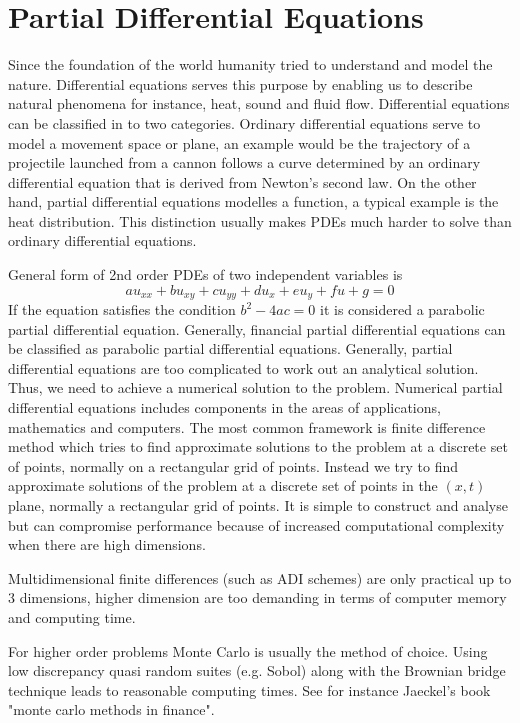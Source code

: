 \documentclass[12pt, oneside]{book}
\theoremstyle{plain}
\theoremstyle{definition}
\begin{document}
\section{Partial Differential Equations}
Since the foundation of the world humanity tried to understand and model the nature. Differential equations serves this purpose by enabling us to describe natural phenomena for instance, heat, sound and fluid flow. 
Differential equations can be classified in to two categories. Ordinary differential equations serve to model a movement space or plane, an example would be the trajectory of a projectile launched from a cannon follows a curve determined by an ordinary differential equation that is derived from Newton's second law.
On the other hand, partial differential equations modelles a function, a typical example is the heat distribution. This distinction usually makes PDEs much harder to solve than ordinary differential equations.

General form of 2nd order PDEs of two independent variables is $$ au_{xx} + bu_{xy} + cu_{yy} + du_x + eu_y + fu + g = 0 $$ If the equation satisfies the condition $ b^2 - 4ac = 0 $  it is considered a parabolic partial differential equation. Generally, financial partial differential equations can be classified as parabolic partial differential equations. Generally, partial differential equations are too complicated to work out an analytical solution. Thus, we need to achieve a numerical solution to the problem. Numerical partial differential equations includes components in the areas of applications, mathematics and computers. The most common framework is finite difference method which tries to find approximate solutions to the problem at a discrete set of points, normally on a rectangular grid of points. Instead we try to find approximate solutions of the problem at a discrete set of points in the $(x, t)$ plane, normally a rectangular grid of points. It is simple to construct and analyse but can compromise performance because of increased computational complexity when there are high dimensions. 

Multidimensional finite differences (such as ADI schemes) are only practical up to 3 dimensions, higher dimension are too demanding in terms of computer memory and computing time.

For higher order problems Monte Carlo is usually the method of choice. Using low discrepancy quasi random suites (e.g. Sobol) along with the Brownian bridge technique leads to reasonable computing times. See for instance Jaeckel's book "monte carlo methods in finance".
\end{document}
